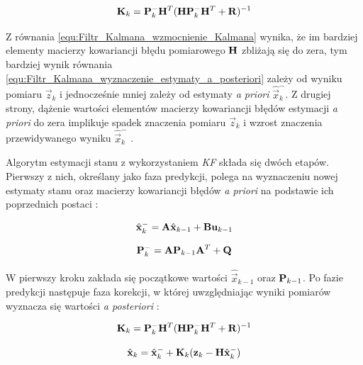 \begin{equation}
\label{equ:Filtr_Kalmana_wzmocnienie_Kalmana}
	\mathbf{K}_k = \mathbf{P}_k^- \mathbf{H}^T ( \mathbf{H} \mathbf{P}_k^- \mathbf{H}^T +\mathbf{R} ) ^ {-1}
\end{equation}

Z równania \ref{equ:Filtr_Kalmana_wzmocnienie_Kalmana} wynika, że im bardziej elementy macierzy kowariancji błędu pomiarowego $\mathbf{H}$ zbliżają się do zera, tym bardziej wynik równania \ref{equ:Filtr_Kalmana_wyznaczenie_estymaty_a_posteriori} zależy od wyniku pomiaru $\vec{z}_k$ i jednocześnie mniej zależy od estymaty \textit{a priori} $\hat{\vec{x}}_k^-$. Z drugiej strony, dążenie wartości elementów macierzy kowariancji błędów estymacji \textit{a priori} do zera implikuje spadek znaczenia pomiaru $\vec{z}_k$ i wzrost znaczenia przewidywanego wyniku $\hat{\vec{x}}_k^-$ \cite{Welch1995}.

Algorytm estymacji stanu z wykorzystaniem \textit{KF} składa się dwóch etapów. Pierwszy z nich, określany jako faza predykcji, polega na wyznaczeniu nowej estymaty stanu oraz macierzy kowariancji błędów \textit{a priori} na podstawie ich poprzednich postaci \cite{Welch1995}:

\begin{equation}
\label{equ:Filtr_Kalmana_faza_predykcji_stan}
	\hat{\vec{x}}_k^- = \matr{A} \hat{\vec{x}}_{k-1} + \matr{B} \vec{u}_{k - 1}
\end{equation}

\begin{equation}
\label{equ:Filtr_Kalmana_faza_predykcji_macierz_kowariancji_bledow}
	\mathbf{P}_k^- = \mathbf{A} \mathbf{P}_{k-1} \mathbf{A}^T + \mathbf{Q}
\end{equation}

W pierwszy kroku zakłada się początkowe wartości $\hat{\vec{x}}_{k-1}$ oraz $\mathbf{P}_{k-1}$. Po fazie predykcji następuje faza korekcji, w której uwzględniając wyniki pomiarów wyznacza się wartości \textit{a posteriori} \cite{Welch1995}:

\begin{equation}
\label{equ:Filtr_Kalmana_faza_korekcji_wzmocnienie}
	\mathbf{K}_k = \mathbf{P}_k^- \mathbf{H}^T ( \mathbf{H} \mathbf{P}_k^- \mathbf{H}^T +\mathbf{R} ) ^ {-1}
\end{equation}

\begin{equation}
\label{equ:Filtr_Kalmana_faza_korekcji_stan}
	\hat{\vec{x}}_k = \hat{\vec{x}}_k^- + \matr{K}_k(\vec{z}_k - \matr{H}\hat{\vec{x}}_k^-)
\end{equation}


